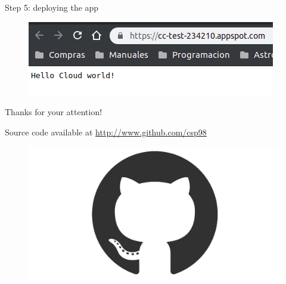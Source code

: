 \documentclass{beamer}
\begin{document}
\begin{frame}[fragile]{Step 5: deploying the app}
    \begin{figure}[H]
      \centering
      \includegraphics[scale=0.75]{../img/tutorial/9browse}
    \end{figure}
\end{frame}


\begin{frame}[fragile]
 \begin{center}
  \Huge
  Thanks for your attention!
 \end{center}
 \vspace{2cm}
 Source code available at \textcolor{blue}{\url{http://www.github.com/csp98}}
 \vspace{1cm}
 \begin{figure}[H]
  \centering
  \includegraphics[scale=0.05]{../img/github-mark.png}
 \end{figure}

\end{frame}
\end{document}
